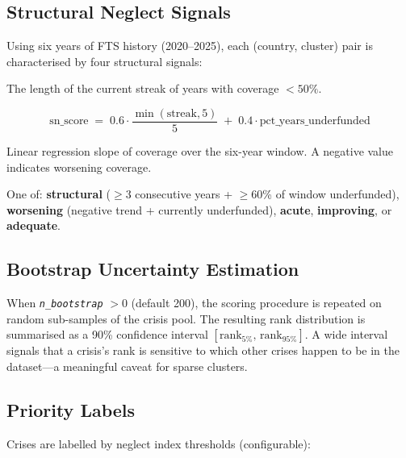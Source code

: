 \documentclass[11pt,a4paper]{article}
\newcommand{\param}[1]{\texttt{\textit{#1}}}
\begin{document}
\subsection{Structural Neglect Signals}

Using six years of FTS history (2020--2025), each (country, cluster) pair is
characterised by four structural signals:

\begin{description}[labelindent=0.5cm, labelsep=1em]
  \item[\texttt{consecutive\_years\_underfunded}]
        The length of the current streak of years with coverage $<50\%$.
  \item[\texttt{structural\_neglect\_score}]
        \[
          \text{sn\_score} \;=\; 0.6 \cdot \frac{\min(\text{streak}, 5)}{5}
          \;+\; 0.4 \cdot \text{pct\_years\_underfunded}
        \]
  \item[\texttt{coverage\_trend}]
        Linear regression slope of coverage over the six-year window.
        A negative value indicates worsening coverage.
  \item[\texttt{neglect\_type}]
        One of: \textbf{structural} ($\geq$3 consecutive years + $\geq$60\% of window
        underfunded), \textbf{worsening} (negative trend + currently underfunded),
        \textbf{acute}, \textbf{improving}, or \textbf{adequate}.
\end{description}

\subsection{Bootstrap Uncertainty Estimation}

When \param{n\_bootstrap} $> 0$ (default 200), the scoring procedure is repeated on
random sub-samples of the crisis pool.
The resulting rank distribution is summarised as a 90\% confidence interval
$[\text{rank}_{5\%},\, \text{rank}_{95\%}]$.
A wide interval signals that a crisis's rank is sensitive to which other crises happen
to be in the dataset---a meaningful caveat for sparse clusters.

\subsection{Priority Labels}

Crises are labelled by neglect index thresholds (configurable):
\end{document}
